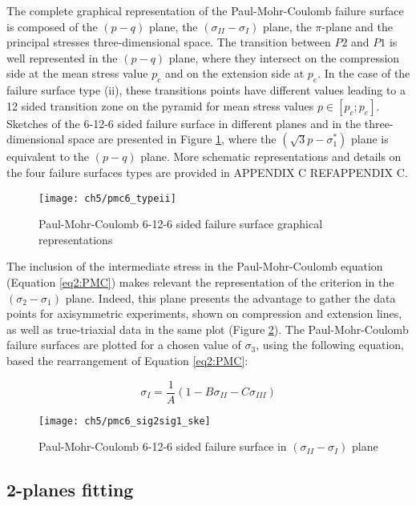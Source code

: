 The complete graphical representation of the Paul-Mohr-Coulomb failure surface is composed of the $(p-q)$ plane, the $(\sigma_{II}-\sigma_{I})$ plane, the $\pi$-plane and the principal stresses three-dimensional space. The transition between $P2$ and $P1$ is well represented in the $(p-q)$ plane, where they intersect on the compression side at the mean stress value $p_c$ and on the extension side at $p_e$. In the case of the failure surface type (ii), these transitions points have different values leading to a 12 sided transition zone on the pyramid for mean stress values $p \in \left[p_c;p_e\right]$. Sketches of the 6-12-6 sided failure surface in different planes and in the three-dimensional space are presented in Figure \ref{fig5:6pmc_typeii}, where the $(\sqrt{3}p-\sigma_{1}^*)$ plane is equivalent to the $(p-q)$ plane. More schematic representations and details on the four failure surfaces types are provided in APPENDIX C REF{APPENDIX C}.

\begin{figure}
    \centering
    \texttt{[image: ch5/pmc6\_typeii]}
    \caption{Paul-Mohr-Coulomb 6-12-6 sided failure surface graphical representations}
    \label{fig5:6pmc_typeii}
\end{figure}

The inclusion of the intermediate stress in the Paul-Mohr-Coulomb equation (Equation \ref{eq2:PMC}) makes relevant the representation of the criterion in the $(\sigma_2-\sigma_1)$ plane. Indeed, this plane presents the advantage to gather the data points for axisymmetric experiments, shown on compression and extension lines, as well as true-triaxial data in the same plot (Figure \ref{fig5:6pmc_sig2sig1}). The Paul-Mohr-Coulomb failure surfaces are plotted for a chosen value of $\sigma_3$, using the following equation, based the rearrangement of Equation \ref{eq2:PMC}:

\begin{equation}\label{eq5:pmc_sig2sig1}
    \sigma_I = \frac{1}{A}\left(1-B\sigma_{II}-C\sigma_{III}\right)
\end{equation}
\begin{figure}
    \centering
    \texttt{[image: ch5/pmc6\_sig2sig1\_ske]}
    \caption{Paul-Mohr-Coulomb 6-12-6 sided failure surface in $(\sigma_{II}-\sigma_{I})$ plane}
    \label{fig5:6pmc_sig2sig1}
\end{figure}

\subsection{2-planes fitting}\label{ch5:algo}

